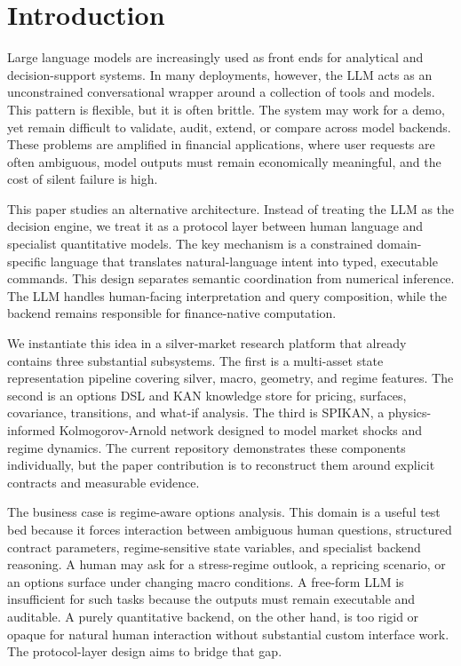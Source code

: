 \documentclass[11pt]{article}
\begin{document}
\section{Introduction}

Large language models are increasingly used as front ends for analytical and
decision-support systems. In many deployments, however, the LLM acts as an
unconstrained conversational wrapper around a collection of tools and models.
This pattern is flexible, but it is often brittle. The system may work for a
demo, yet remain difficult to validate, audit, extend, or compare across model
backends. These problems are amplified in financial applications, where user
requests are often ambiguous, model outputs must remain economically meaningful,
and the cost of silent failure is high.

This paper studies an alternative architecture. Instead of treating the LLM as
the decision engine, we treat it as a protocol layer between human language and
specialist quantitative models. The key mechanism is a constrained
domain-specific language that translates natural-language intent into typed,
executable commands. This design separates semantic coordination from numerical
inference. The LLM handles human-facing interpretation and query composition,
while the backend remains responsible for finance-native computation.

We instantiate this idea in a silver-market research platform that already
contains three substantial subsystems. The first is a multi-asset state
representation pipeline covering silver, macro, geometry, and regime features.
The second is an options DSL and KAN knowledge store for pricing, surfaces,
covariance, transitions, and what-if analysis. The third is SPIKAN, a
physics-informed Kolmogorov-Arnold network designed to model market shocks and
regime dynamics. The current repository demonstrates these components
individually, but the paper contribution is to reconstruct them around explicit
contracts and measurable evidence.

The business case is regime-aware options analysis. This domain is a useful test
bed because it forces interaction between ambiguous human questions, structured
contract parameters, regime-sensitive state variables, and specialist backend
reasoning. A human may ask for a stress-regime outlook, a repricing scenario, or
an options surface under changing macro conditions. A free-form LLM is
insufficient for such tasks because the outputs must remain executable and
auditable. A purely quantitative backend, on the other hand, is too rigid or
opaque for natural human interaction without substantial custom interface work.
The protocol-layer design aims to bridge that gap.
\end{document}
